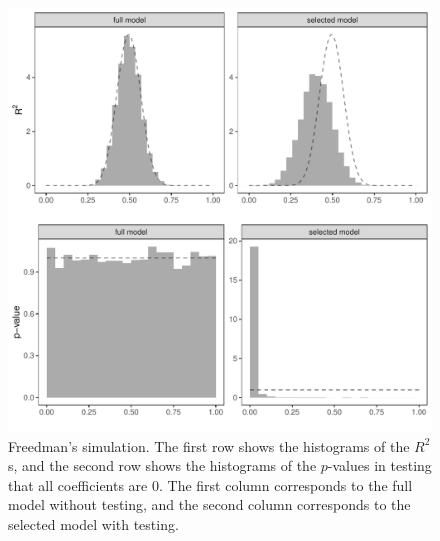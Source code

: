 \begin{figure}[ht]
\centering
\includegraphics[width =  \textwidth]{figures/freedman_simulation_ggplot.pdf}
\caption{Freedman's simulation. The first row shows the histograms of the $R^2$s, and the second row shows the histograms of the $p$-values in testing that all coefficients are 0. The first column corresponds to the full model without testing, and the second column corresponds to the selected model with testing.
}\label{fig::freedman-simulation}
\end{figure}


